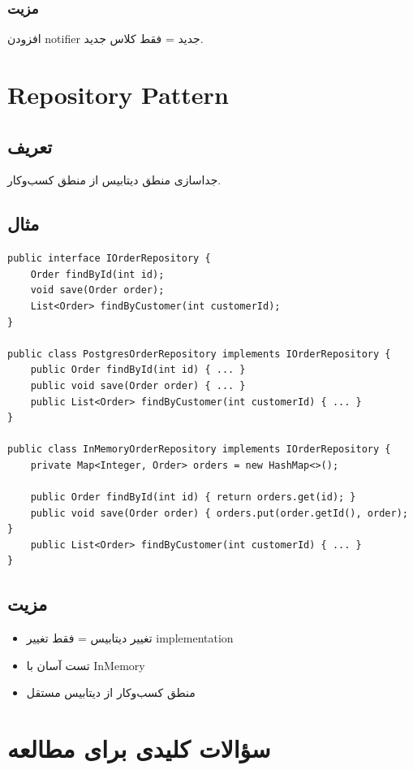 \documentclass[12pt, a4paper]{article}
\begin{document}
\subsubsection{مزیت}
افزودن notifier جدید = فقط کلاس جدید.

\section{Repository Pattern}

\subsection{تعریف}
جداسازی منطق دیتابیس از منطق کسب‌وکار.

\subsection{مثال}
\begin{lstlisting}
public interface IOrderRepository {
    Order findById(int id);
    void save(Order order);
    List<Order> findByCustomer(int customerId);
}

public class PostgresOrderRepository implements IOrderRepository {
    public Order findById(int id) { ... }
    public void save(Order order) { ... }
    public List<Order> findByCustomer(int customerId) { ... }
}

public class InMemoryOrderRepository implements IOrderRepository {
    private Map<Integer, Order> orders = new HashMap<>();
    
    public Order findById(int id) { return orders.get(id); }
    public void save(Order order) { orders.put(order.getId(), order); }
    public List<Order> findByCustomer(int customerId) { ... }
}
\end{lstlisting}

\subsection{مزیت}
\begin{itemize}
    \item تغییر دیتابیس = فقط تغییر implementation
    \item تست آسان با InMemory
    \item منطق کسب‌وکار از دیتابیس مستقل
\end{itemize}

\section{سؤالات کلیدی برای مطالعه}
\end{document}
